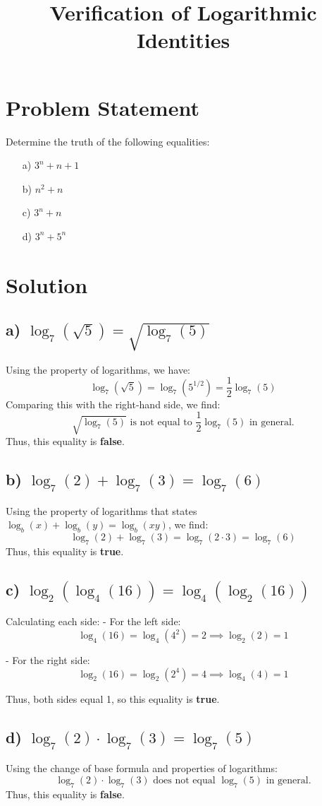 \documentclass{article}
\title{Verification of Logarithmic Identities}
\author{}
\date{}
\begin{document}
\maketitle

\section{Problem Statement}

Determine the truth of the following equalities:
\begin{enumerate}
\item[a)] \( 3^n + n + 1 \)
\item[b)] \( n^2 + n \)
\item[c)] \( 3^n + n \)
\item[d)] \( 3^n + 5^n \)
\end{enumerate}

\section{Solution}

\subsection{a) $\log_{7} (\sqrt{5}) = \sqrt{\log_{7} (5)}$}

Using the property of logarithms, we have:
\[
\log_{7} (\sqrt{5}) = \log_{7} (5^{1/2}) = \frac{1}{2} \log_{7} (5)
\]
Comparing this with the right-hand side, we find:
\[
\sqrt{\log_{7} (5)} \text{ is not equal to } \frac{1}{2} \log_{7} (5) \text{ in general.}
\]
Thus, this equality is \textbf{false}.

\subsection{b) $\log_{7} (2) + \log_{7} (3) = \log_{7} (6)$}

Using the property of logarithms that states $\log_{b} (x) + \log_{b} (y) = \log_{b} (xy)$, we find:
\[
\log_{7} (2) + \log_{7} (3) = \log_{7} (2 \cdot 3) = \log_{7} (6)
\]
Thus, this equality is \textbf{true}.

\subsection{c) $\log_{2} (\log_{4} (16)) = \log_{4} (\log_{2} (16))$}

Calculating each side:
- For the left side:
\[
\log_{4} (16) = \log_{4} (4^2) = 2 \implies \log_{2} (2) = 1
\]

- For the right side:
\[
\log_{2} (16) = \log_{2} (2^4) = 4 \implies \log_{4} (4) = 1
\]

Thus, both sides equal 1, so this equality is \textbf{true}.

\subsection{d) $\log_{7} (2) \cdot \log_{7} (3) = \log_{7} (5)$}

Using the change of base formula and properties of logarithms:
\[
\log_{7} (2) \cdot \log_{7} (3) \text{ does not equal } \log_{7} (5) \text{ in general.}
\]
Thus, this equality is \textbf{false}.
\end{document}
